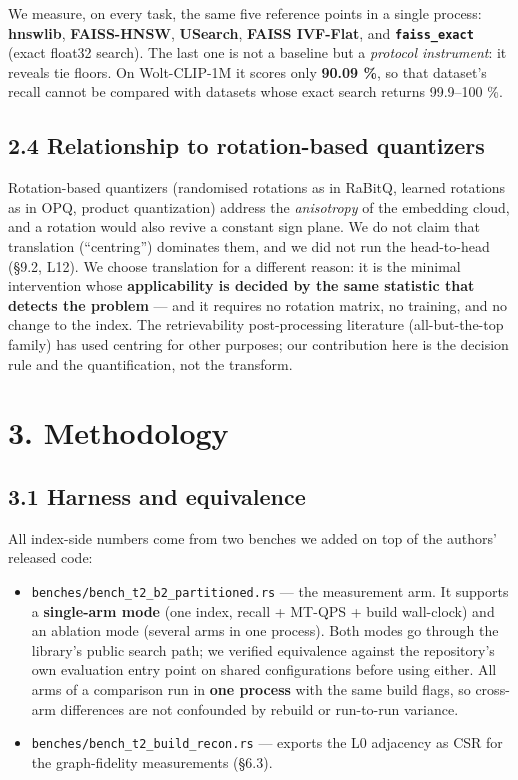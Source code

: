 \documentclass[
  10pt,
]{article}
\providecommand{\tightlist}{%
  \setlength{\itemsep}{0pt}\setlength{\parskip}{0pt}}
\begin{document}
We measure, on every task, the same five reference points in a single
process: \textbf{hnswlib}, \textbf{FAISS-HNSW}, \textbf{USearch},
\textbf{FAISS IVF-Flat}, and \textbf{\texttt{faiss\_exact}} (exact
float32 search). The last one is not a baseline but a \emph{protocol
instrument}: it reveals tie floors. On Wolt-CLIP-1M it scores only
\textbf{90.09 \%}, so that dataset's recall cannot be compared with
datasets whose exact search returns 99.9--100 \%.

\subsection{2.4 Relationship to rotation-based
quantizers}\label{relationship-to-rotation-based-quantizers}

Rotation-based quantizers (randomised rotations as in RaBitQ, learned
rotations as in OPQ, product quantization) address the \emph{anisotropy}
of the embedding cloud, and a rotation would also revive a constant sign
plane. We do not claim that translation (``centring'') dominates them,
and we did not run the head-to-head (§9.2, L12). We choose translation
for a different reason: it is the minimal intervention whose
\textbf{applicability is decided by the same statistic that detects the
problem} --- and it requires no rotation matrix, no training, and no
change to the index. The retrievability post-processing literature
(all-but-the-top family) has used centring for other purposes; our
contribution here is the decision rule and the quantification, not the
transform.

\section{3. Methodology}\label{methodology}

\subsection{3.1 Harness and equivalence}\label{harness-and-equivalence}

All index-side numbers come from two benches we added on top of the
authors' released code:

\begin{itemize}
\tightlist
\item
  \texttt{benches/bench\_t2\_b2\_partitioned.rs} --- the measurement
  arm. It supports a \textbf{single-arm mode} (one index, recall +
  MT-QPS + build wall-clock) and an ablation mode (several arms in one
  process). Both modes go through the library's public search path; we
  verified equivalence against the repository's own evaluation entry
  point on shared configurations before using either. All arms of a
  comparison run in \textbf{one process} with the same build flags, so
  cross-arm differences are not confounded by rebuild or run-to-run
  variance.
\item
  \texttt{benches/bench\_t2\_build\_recon.rs} --- exports the L0
  adjacency as CSR for the graph-fidelity measurements (§6.3).
\end{itemize}
\end{document}

